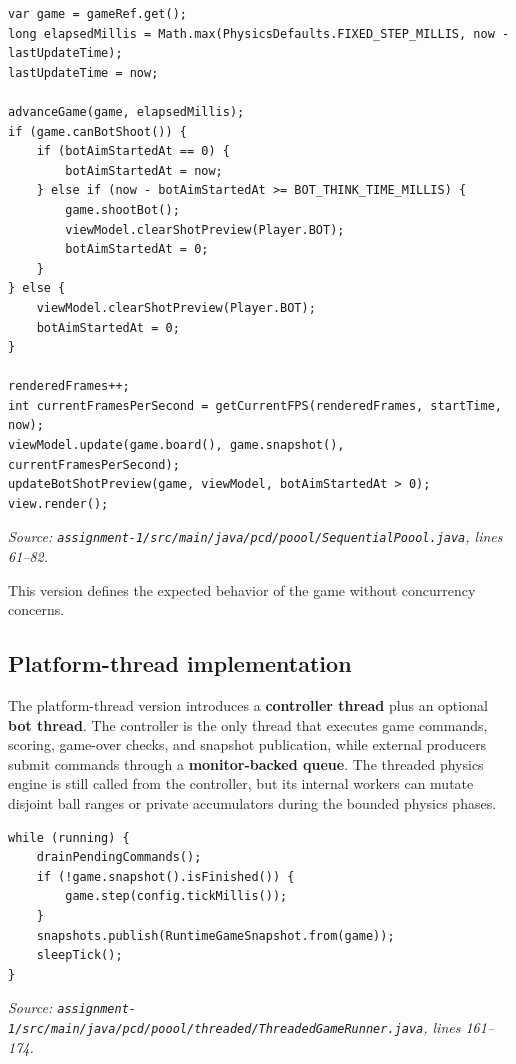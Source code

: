 \begin{lstlisting}[style=codestyle,caption={Sequential main loop},label={lst:sequential-main-loop}]
var game = gameRef.get();
long elapsedMillis = Math.max(PhysicsDefaults.FIXED_STEP_MILLIS, now - lastUpdateTime);
lastUpdateTime = now;

advanceGame(game, elapsedMillis);
if (game.canBotShoot()) {
    if (botAimStartedAt == 0) {
        botAimStartedAt = now;
    } else if (now - botAimStartedAt >= BOT_THINK_TIME_MILLIS) {
        game.shootBot();
        viewModel.clearShotPreview(Player.BOT);
        botAimStartedAt = 0;
    }
} else {
    viewModel.clearShotPreview(Player.BOT);
    botAimStartedAt = 0;
}

renderedFrames++;
int currentFramesPerSecond = getCurrentFPS(renderedFrames, startTime, now);
viewModel.update(game.board(), game.snapshot(), currentFramesPerSecond);
updateBotShotPreview(game, viewModel, botAimStartedAt > 0);
view.render();
\end{lstlisting}

\noindent\textit{Source: \texttt{assignment-1/src/main/java/pcd/poool/SequentialPoool.java}, lines 61--82.}

This version defines the expected behavior of the game without concurrency concerns.

\subsection{Platform-thread implementation}

The platform-thread version introduces a \textbf{controller thread} plus an optional \textbf{bot thread}. The controller is the only thread that executes game commands, scoring, game-over checks, and snapshot publication, while external producers submit commands through a \textbf{monitor-backed queue}. The threaded physics engine is still called from the controller, but its internal workers can mutate disjoint ball ranges or private accumulators during the bounded physics phases.

\begin{lstlisting}[style=codestyle,caption={Threaded controller loop},label={lst:threaded-controller-loop}]
while (running) {
    drainPendingCommands();
    if (!game.snapshot().isFinished()) {
        game.step(config.tickMillis());
    }
    snapshots.publish(RuntimeGameSnapshot.from(game));
    sleepTick();
}
\end{lstlisting}

\noindent\textit{Source: \texttt{assignment-1/src/main/java/pcd/poool/threaded/ThreadedGameRunner.java}, lines 161--174.}

